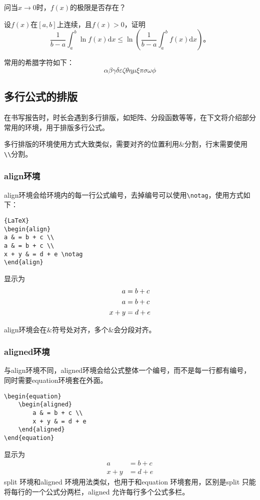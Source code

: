 问当$x\to 0$时，$f(x)$的极限是否存在？

设$f(x)$在$[a,b]$上连续，且$f(x)>0$，证明
\begin{equation}
\frac{1}{b-a}\int_{a}^{b}\ln f(x)\text{d}x\leqslant \ln \left(\frac{1}{b-a}\int_{a}^{b}f(x)\text{d}x\right)\text{。}
\end{equation}

常用的希腊字符如下：
\[\alpha \beta \gamma \delta \varepsilon \zeta \theta \eta \mu \xi \pi \sigma \omega \phi\]
\subsection{多行公式的排版}
在书写报告时，时长会遇到多行排版，如矩阵、分段函数等等，在下文将介绍部分常用的环境，用于排版多行公式。

多行排版的环境使用方式大致类似，需要对齐的位置利用$\&$分割，行末需要使用\verb|\\|分割。
\subsubsection{align环境}
align环境会给环境内的每一行公式编号，去掉编号可以使用\verb|\notag|，使用方式如下：
\begin{verbatim}{LaTeX}
\begin{align}
a & = b + c \\
a & = b + c \\
x + y & = d + e \notag
\end{align}
\end{verbatim}
显示为
\begin{align}
a & = b + c \\
a & = b + c \\
x + y & = d + e \notag
\end{align}

align环境会在$\&$符号处对齐，多个$\&$会分段对齐。
\subsubsection{aligned环境}
与align环境不同，aligned环境会给公式整体一个编号，而不是每一行都有编号，同时需要equation环境套在外面。
\begin{verbatim}
\begin{equation}
	\begin{aligned}
		a & = b + c \\
		x + y & = d + e 
	\end{aligned}
\end{equation}
\end{verbatim}
显示为
\begin{equation}
	\begin{aligned}
		a & = b + c \\
		x + y & = d + e 
	\end{aligned}
\end{equation}
split 环境和aligned 环境用法类似，也用于和equation 环境套用，区别是split 只能
将每行的一个公式分两栏，aligned 允许每行多个公式多栏。
